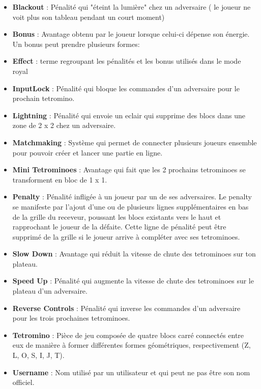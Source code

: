 \documentclass{article}
\begin{document}
\begin{itemize}

    \item \textbf{Blackout} : Pénalité qui "éteint la lumière" chez un adversaire ( le joueur ne voit plus son tableau pendant un court moment)
    
	\item \textbf{Bonus} : Avantage obtenu par le joueur lorsque celui-ci dépense son énergie. Un bonus peut prendre plusieurs formes:

    \item \textbf{Effect} : terme regroupant les pénalités et les bonus utilisés dans le mode royal

    \item \textbf{InputLock} : Pénalité qui bloque les commandes d'un adversaire pour le prochain tetromino.

    \item \textbf{Lightning} : Pénalité qui envoie un eclair qui supprime des blocs dans une zone de 2 x 2 chez un adversaire.

    \item \textbf{Matchmaking} : Système qui permet de connecter plusieurs joueurs ensemble pour pouvoir créer et lancer une partie en ligne.
    
    \item \textbf{Mini Tetrominoes} : Avantage qui fait que les 2 prochains tetrominoes se transforment en bloc de 1 x 1.
    
	\item \textbf{Penalty} : Pénalité infligée à un joueur par un de ses adversaires. Le penalty se manifeste par l'ajout d'une ou de plusieurs lignes supplémentaires en bas de la grille du receveur, poussant les blocs existants vers le haut et rapprochant le joueur de la défaite. Cette ligne de pénalité peut être supprimé de la grille si le joueur arrive à compléter avec ses tetrominoes. 
    
    \item \textbf{Slow Down} : Avantage qui réduit la vitesse de chute des tetrominoes sur ton plateau.

    \item \textbf{Speed Up} : Pénalité qui augmente la vitesse de chute des tetrominoes sur le plateau d'un adversaire.

    \item \textbf{Reverse Controls} : Pénalité qui inverse les commandes d'un adversaire pour les trois prochaines tetrominoes.

    \item \textbf{Tetromino} : Pièce de jeu composée de quatre blocs carré connectés entre eux de manière à former différentes formes géométriques, respectivement (Z, L, O, S, I, J, T). 

    \item \textbf{Username} : Nom utilisé par un utilisateur et qui peut ne pas être son nom officiel.

\end{itemize}
\end{document}
